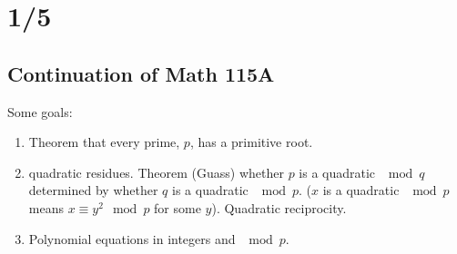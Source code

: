 \section*{1/5}
  \subsection*{Continuation of Math 115A}
    Some goals: 
    \begin{enumerate}
      \item Theorem that every prime, $p$, has a primitive root.
      \item quadratic residues. Theorem (Guass) whether $p$ is a quadratic $\mod
        q$ determined by whether $q$ is a quadratic $\mod p$. ($x$ is a quadratic
        $\mod p$ means $x \equiv y^2 \mod p$ for some $y$). Quadratic 
        reciprocity.
      \item Polynomial equations in integers and $\mod p$.
    \end{enumerate}

